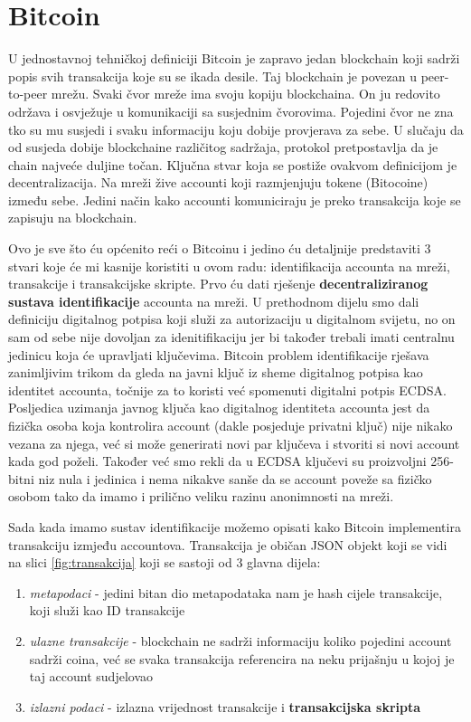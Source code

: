 \documentclass[12pt]{report}
\begin{document}
\section{Bitcoin}

U jednostavnoj tehničkoj definiciji Bitcoin je zapravo jedan blockchain koji sadrži popis svih transakcija koje su se ikada desile. Taj blockchain je povezan u peer-to-peer mrežu. Svaki čvor mreže ima svoju kopiju blockchaina. On ju redovito održava i osvježuje u komunikaciji sa susjednim čvorovima. Pojedini čvor ne zna tko su mu susjedi i svaku informaciju koju dobije provjerava za sebe. U slučaju da od susjeda dobije blockchaine različitog sadržaja, protokol pretpostavlja da je chain najveće duljine točan. Ključna stvar koja se postiže ovakvom definicijom je decentralizacija. Na mreži žive accounti koji razmjenjuju tokene (Bitocoine) između sebe. Jedini način kako accounti komuniciraju je preko transakcija koje se zapisuju na blockchain. 

Ovo je sve što ću općenito reći o Bitcoinu i jedino ću detaljnije predstaviti 3 stvari koje će mi kasnije koristiti u ovom radu: identifikacija accounta na mreži, transakcije i transakcijske skripte. Prvo ću dati rješenje \textbf{decentraliziranog sustava identifikacije} accounta na mreži. U prethodnom dijelu smo dali definiciju digitalnog potpisa koji služi za autorizaciju u digitalnom svijetu, no on sam od sebe nije dovoljan za idenitifikaciju jer bi također trebali imati centralnu jedinicu koja će upravljati ključevima. Bitcoin problem identifikacije rješava zanimljivim trikom da gleda na javni ključ iz sheme digitalnog potpisa kao identitet accounta, točnije za to koristi već spomenuti digitalni potpis ECDSA. Posljedica uzimanja javnog ključa kao digitalnog identiteta accounta jest da fizička osoba koja kontrolira account (dakle posjeduje privatni ključ) nije nikako vezana za njega, već si može generirati novi par ključeva i stvoriti si novi account kada god poželi. Također već smo rekli da u ECDSA ključevi su proizvoljni 256-bitni niz nula i jedinica i nema nikakve sanše da se account poveže sa fizičko osobom tako da imamo i prilično veliku razinu anonimnosti na mreži.

Sada kada imamo sustav identifikacije možemo opisati kako Bitcoin implementira transakciju izmjeđu accountova. Transakcija je običan JSON objekt koji se vidi na slici \ref{fig:transakcija} koji se sastoji od 3 glavna dijela:
\begin{enumerate}
    \item \textit{metapodaci} - jedini bitan dio metapodataka nam je hash cijele transakcije, koji služi kao ID transakcije
    \item\textit{ulazne transakcije} - blockchain ne sadrži informaciju koliko pojedini account sadrži coina, već se svaka transakcija referencira na neku prijašnju u kojoj je taj account sudjelovao
    \item \textit{izlazni podaci} - izlazna vrijednost transakcije i \textbf{transakcijska skripta}
\end{enumerate}
\end{document}
